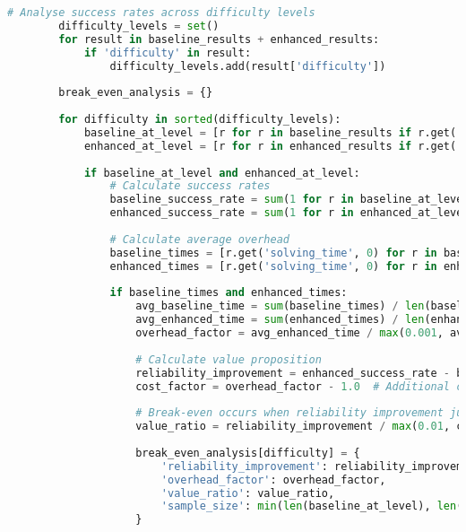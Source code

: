 \begin{lstlisting}[language=Python, caption=Cost-Benefit Threshold Analysis for Deployment Guidance]
        # Analyse success rates across difficulty levels
        difficulty_levels = set()
        for result in baseline_results + enhanced_results:
            if 'difficulty' in result:
                difficulty_levels.add(result['difficulty'])
        
        break_even_analysis = {}
        
        for difficulty in sorted(difficulty_levels):
            baseline_at_level = [r for r in baseline_results if r.get('difficulty') == difficulty]
            enhanced_at_level = [r for r in enhanced_results if r.get('difficulty') == difficulty]
            
            if baseline_at_level and enhanced_at_level:
                # Calculate success rates
                baseline_success_rate = sum(1 for r in baseline_at_level if r.get('satisfiable', False)) / len(baseline_at_level)
                enhanced_success_rate = sum(1 for r in enhanced_at_level if r.get('satisfiable', False)) / len(enhanced_at_level)
                
                # Calculate average overhead
                baseline_times = [r.get('solving_time', 0) for r in baseline_at_level if r.get('satisfiable', False)]
                enhanced_times = [r.get('solving_time', 0) for r in enhanced_at_level if r.get('satisfiable', False)]
                
                if baseline_times and enhanced_times:
                    avg_baseline_time = sum(baseline_times) / len(baseline_times)
                    avg_enhanced_time = sum(enhanced_times) / len(enhanced_times)
                    overhead_factor = avg_enhanced_time / max(0.001, avg_baseline_time)
                    
                    # Calculate value proposition
                    reliability_improvement = enhanced_success_rate - baseline_success_rate
                    cost_factor = overhead_factor - 1.0  # Additional cost
                    
                    # Break-even occurs when reliability improvement justifies cost
                    value_ratio = reliability_improvement / max(0.01, cost_factor)
                    
                    break_even_analysis[difficulty] = {
                        'reliability_improvement': reliability_improvement,
                        'overhead_factor': overhead_factor,
                        'value_ratio': value_ratio,
                        'sample_size': min(len(baseline_at_level), len(enhanced_at_level))
                    }
        

\end{lstlisting}

